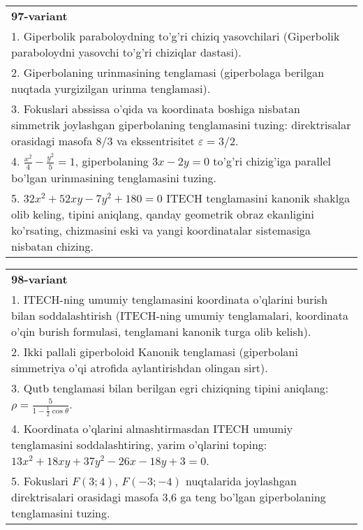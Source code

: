 \documentclass{article}
\begin{document}
\begin{tabular}{m{17cm}}
\textbf{97-variant}\\
1. Giperbolik paraboloydning to'g'ri chiziq yasovchilari (Giperbolik paraboloydni yasovchi to'g'ri chiziqlar dastasi).\\

2. Giperbolaning urinmasining tenglamasi (giperbolaga berilgan nuqtada yurgizilgan urinma tenglamasi).\\

3. Fokuslari abssissa o'qida va koordinata boshiga nisbatan simmetrik joylashgan giperbolaning tenglamasini tuzing: direktrisalar orasidagi masofa $8/3$ va ekssentrisitet $\varepsilon=3/2$.\\

4. $\frac{x^{2}}{4} - \frac{y^{2}}{5} = 1$, giperbolaning $3x - 2y = 0$ to'g'ri chizig'iga parallel bo'lgan urinmasining tenglamasini tuzing.  \\

5. $32x^{2} + 52xy - 7y^{2} + 180 = 0$ ITECH tenglamasini kanonik shaklga olib keling, tipini aniqlang, qanday geometrik obraz ekanligini ko'rsating, chizmasini eski va yangi koordinatalar sistemasiga nisbatan chizing.  
\end{tabular}
\vspace{1cm}


\begin{tabular}{m{17cm}}
\textbf{98-variant}\\
1. ITECH-ning umumiy tenglamasini koordinata o'qlarini burish bilan soddalashtirish (ITECH-ning umumiy tenglamalari, koordinata o'qin burish formulasi, tenglamani kanonik turga olib kelish).\\

2. Ikki pallali giperboloid Kanonik tenglamasi (giperbolani simmetriya o'qi atrofida aylantirishdan olingan sirt).\\

3. Qutb tenglamasi bilan berilgan egri chiziqning tipini aniqlang: $\rho=\frac{5}{1-\frac{1}{2}\cos\theta}$.\\

4. Koordinata o'qlarini almashtirmasdan ITECH umumiy tenglamasini soddalashtiring, yarim o'qlarini toping: $13x^{2} + 18xy + 37y^{2} - 26x - 18y + 3 = 0$.  \\

5. Fokuslari $F(3;4)$, $F(-3;-4)$ nuqtalarida joylashgan direktrisalari orasidagi masofa 3,6 ga teng bo'lgan giperbolaning tenglamasini tuzing.  
\end{tabular}
\vspace{1cm}
\end{document}
